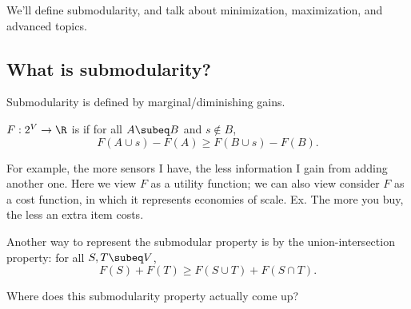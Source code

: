 We'll define submodularity, and talk about minimization, maximization, and advanced topics.
\subsection{What is submodularity?}


Submodularity is defined by marginal/diminishing gains.
\begin{df}
$F:2^V\to \R$ is  if for all $A\subeq B$ and $s\nin B$,
$$F(A\cup s) - F(A) \ge F(B\cup s) -  F(B).$$
\end{df}
For example, the more sensors I have, the less information I gain from adding another one. Here we view $F$ as a utility function; we can also view consider $F$ as a cost function, in which it represents economies of scale. Ex. The more you buy, the less an extra item costs.

Another way to represent the submodular property is by the union-intersection property: for all $S,T\subeq V$,
$$
F(S)+F(T) \ge F(S\cup T) + F(S\cap T).
$$

Where does this submodularity property actually come up?

